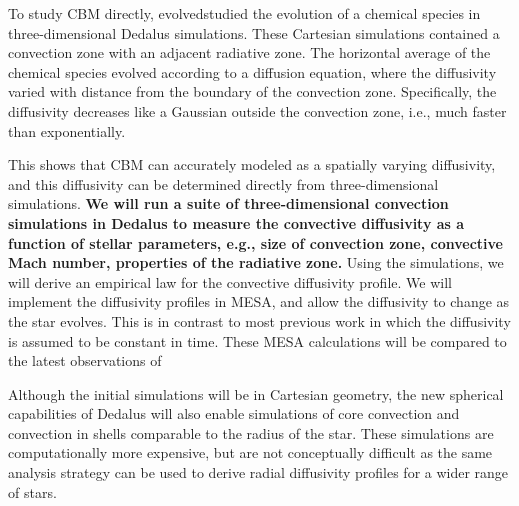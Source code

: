To study CBM directly, \citet{Lecoanet_2016a} evolvedstudied the evolution of a chemical species in three-dimensional Dedalus simulations.  These Cartesian simulations contained a convection zone with an adjacent radiative zone. The horizontal average of the chemical species evolved according to a diffusion equation, where the diffusivity varied with distance from the boundary of the convection zone. Specifically, the diffusivity decreases like a Gaussian outside the convection zone, i.e., much faster than exponentially.

This shows that CBM can accurately modeled as a spatially varying diffusivity, and this diffusivity can be determined directly from three-dimensional simulations. \textbf{We will run a suite of three-dimensional convection simulations in Dedalus to measure the convective diffusivity as a function of stellar parameters, e.g., size of convection zone, convective Mach number, properties of the radiative zone.} Using the simulations, we will derive an empirical law for the convective diffusivity profile. We will implement the diffusivity profiles in MESA, and allow the diffusivity to change as the star evolves. This is in contrast to most previous work in which the diffusivity is assumed to be constant in time. These MESA calculations will be compared to the latest observations of

Although the initial simulations will be in Cartesian geometry, the new spherical capabilities of Dedalus will also enable simulations of core convection and convection in shells comparable to the radius of the star. These simulations are computationally more expensive, but are not conceptually difficult as the same analysis strategy can be used to derive radial diffusivity profiles for a wider range of stars.

